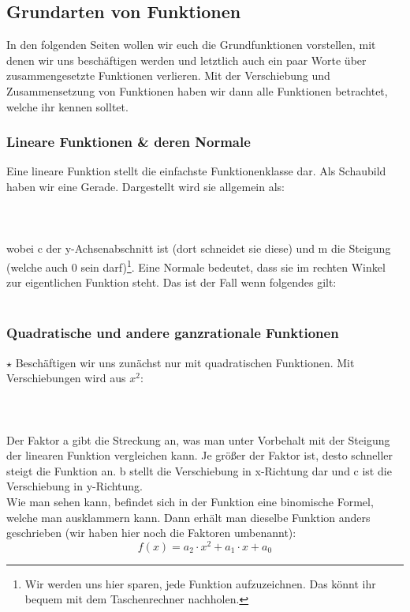 \subsection{Grundarten von Funktionen}
	In den folgenden Seiten wollen wir euch die Grundfunktionen vorstellen, mit
	denen wir uns beschäftigen werden und letztlich auch ein paar Worte über
	zusammengesetzte Funktionen verlieren. Mit der Verschiebung und Zusammensetzung
	von Funktionen haben wir dann alle Funktionen betrachtet, welche ihr kennen
	solltet.

	\subsubsection{Lineare Funktionen \& deren Normale}
		Eine lineare Funktion stellt die einfachste Funktionenklasse dar. Als
		Schaubild haben wir eine Gerade. Dargestellt wird sie allgemein als:
		\\ \\
		\formel{\[f(x)=m \cdot x + c\]}
		\\ \\
		wobei c der y-Achsenabschnitt ist (dort schneidet sie diese) und m die
		Steigung (welche auch 0 sein darf)\footnote{Wir werden uns hier sparen, jede
		Funktion aufzuzeichnen. Das könnt ihr bequem mit dem Taschenrechner
		nachholen.}. Eine Normale bedeutet, dass sie im rechten Winkel zur
		eigentlichen Funktion steht. Das ist der Fall wenn folgendes gilt:
		\\ \\
		\formel{\[m_2=-\frac{1}{m_1}\]}
		

	\subsubsection{Quadratische und andere ganzrationale Funktionen}
		\(\star\) Beschäftigen wir uns zunächst nur mit quadratischen Funktionen. Mit
		Verschiebungen wird aus \(x^2\):
		\\ \\
		\formel{\[f(x)=a(x-b)^2+c\]}
		\\ \\
		Der Faktor a gibt die Streckung an, was man unter Vorbehalt mit der Steigung
		der linearen Funktion vergleichen kann. Je größer der Faktor ist, desto
		schneller steigt die Funktion an. b stellt die Verschiebung in x-Richtung dar
		und c ist die Verschiebung in y-Richtung.\\
		Wie man sehen kann, befindet sich in der Funktion eine binomische Formel,
		welche man ausklammern kann. Dann erhält man dieselbe Funktion anders
		geschrieben (wir haben hier noch die Faktoren umbenannt):
		\[f(x)=a_2 \cdot x^2+a_1 \cdot x+a_0\]

